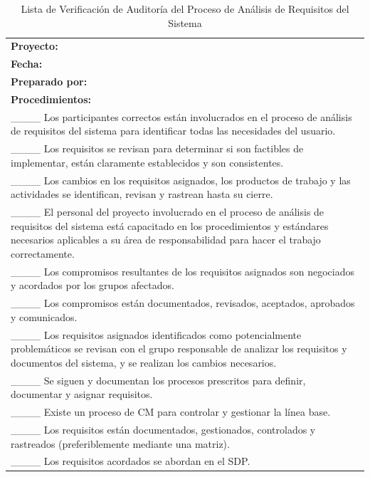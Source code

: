 \begin{table}[H]
\centering
\caption{Lista de Verificación de Auditoría del Proceso de Análisis de Requisitos del Sistema}
\label{fig:b3}
\begin{tabular}{|p{14cm}|}
\hline
\textbf{Proyecto:} \\
\textbf{Fecha:} \\
\textbf{Preparado por:} \\
\hline
\textbf{Procedimientos:} \\
\_\_\_\_ Los participantes correctos están involucrados en el proceso de análisis de requisitos del sistema para identificar todas las necesidades del usuario. \\
\_\_\_\_ Los requisitos se revisan para determinar si son factibles de implementar, están claramente establecidos y son consistentes. \\
\_\_\_\_ Los cambios en los requisitos asignados, los productos de trabajo y las actividades se identifican, revisan y rastrean hasta su cierre. \\
\_\_\_\_ El personal del proyecto involucrado en el proceso de análisis de requisitos del sistema está capacitado en los procedimientos y estándares necesarios aplicables a su área de responsabilidad para hacer el trabajo correctamente. \\
\_\_\_\_ Los compromisos resultantes de los requisitos asignados son negociados y acordados por los grupos afectados. \\
\_\_\_\_ Los compromisos están documentados, revisados, aceptados, aprobados y comunicados. \\
\_\_\_\_ Los requisitos asignados identificados como potencialmente problemáticos se revisan con el grupo responsable de analizar los requisitos y documentos del sistema, y se realizan los cambios necesarios. \\
\_\_\_\_ Se siguen y documentan los procesos prescritos para definir, documentar y asignar requisitos. \\
\_\_\_\_ Existe un proceso de CM para controlar y gestionar la línea base. \\
\_\_\_\_ Los requisitos están documentados, gestionados, controlados y rastreados (preferiblemente mediante una matriz). \\
\_\_\_\_ Los requisitos acordados se abordan en el SDP. \\
\hline
\end{tabular}
\end{table}

